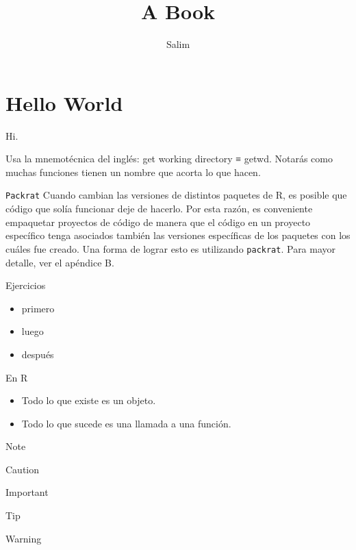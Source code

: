\documentclass[]{book}
\title{A Book}
\author{Salim}
\date{}
\providecommand{\tightlist}{%
  \setlength{\itemsep}{0pt}\setlength{\parskip}{0pt}}
\begin{document}
\maketitle

{
\setcounter{tocdepth}{1}
\tableofcontents
}
\chapter{Hello World}\label{hello-world}

Hi.

\begin{ejemplo}
Usa la mnemotécnica del inglés: get working directory ≡ getwd. Notarás
como muchas funciones tienen un nombre que acorta lo que hacen.
\end{ejemplo}

\begin{ejercicio}
\texttt{Packrat} Cuando cambian las versiones de distintos paquetes de
R, es posible que código que solía funcionar deje de hacerlo. Por esta
razón, es conveniente empaquetar proyectos de código de manera que el
código en un proyecto específico tenga asociados también las versiones
específicas de los paquetes con los cuáles fue creado. Una forma de
lograr esto es utilizando \texttt{packrat}. Para mayor detalle, ver el
apéndice B.
\end{ejercicio}

\begin{importante}
Ejercicios

\begin{itemize}
\tightlist
\item
  primero
\item
  luego
\item
  después
\end{itemize}
\end{importante}

\begin{curiosidad}
En R

\begin{itemize}
\tightlist
\item
  Todo lo que existe es un objeto.
\item
  Todo lo que sucede es una llamada a una función.
\end{itemize}
\end{curiosidad}

\begin{rmdnote}
Note
\end{rmdnote}

\begin{rmdcaution}
Caution
\end{rmdcaution}

\begin{rmdimportant}
Important
\end{rmdimportant}

\begin{rmdtip}
Tip
\end{rmdtip}

\begin{rmdwarning}
Warning
\end{rmdwarning}
\end{document}
